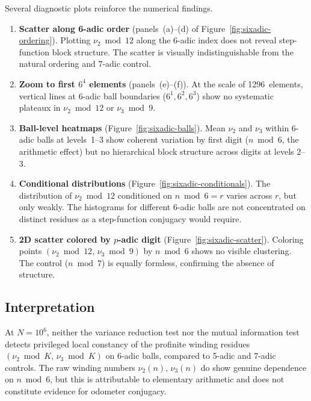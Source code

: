 \documentclass[11pt,a4paper]{article}
\theoremstyle{plain}
\theoremstyle{definition}
\begin{document}
Several diagnostic plots reinforce the numerical findings.

\begin{enumerate}
    \item \textbf{Scatter along 6-adic order} (panels~(a)--(d) of
    Figure~\ref{fig:sixadic-ordering}).
    Plotting $\nu_2 \bmod 12$ along the 6-adic index does not reveal
    step-function block structure.  The scatter is visually
    indistinguishable from the natural ordering and 7-adic control.

    \item \textbf{Zoom to first $6^4$ elements} (panels~(e)--(f)).
    At the scale of 1296~elements, vertical lines at 6-adic ball
    boundaries ($6^1, 6^2, 6^3$) show no systematic plateaux in
    $\nu_2 \bmod 12$ or $\nu_3 \bmod 9$.

    \item \textbf{Ball-level heatmaps} (Figure~\ref{fig:sixadic-balls}).
    Mean $\nu_2$ and $\nu_3$ within 6-adic balls at levels~1--3 show
    coherent variation by first digit ($n \bmod 6$, the arithmetic
    effect) but no hierarchical block structure across digits at levels
    2--3.

    \item \textbf{Conditional distributions}
    (Figure~\ref{fig:sixadic-conditionals}).
    The distribution of $\nu_2 \bmod 12$ conditioned on
    $n \bmod 6 = r$ varies across $r$, but only weakly.  The
    histograms for different 6-adic balls are not concentrated on
    distinct residues as a step-function conjugacy would require.

    \item \textbf{2D scatter colored by $p$-adic digit}
    (Figure~\ref{fig:sixadic-scatter}).
    Coloring points $(\nu_2 \bmod 12,\, \nu_3 \bmod 9)$ by
    $n \bmod 6$ shows no visible clustering.  The control
    ($n \bmod 7$) is equally formless, confirming the absence of
    structure.
\end{enumerate}


\subsection{Interpretation}

\begin{mainresult}
\label{res:sixadic-negative}
    At $N = 10^6$, neither the variance reduction test nor the
    mutual information test detects privileged local constancy of the
    profinite winding residues $(\nu_2 \bmod K,\, \nu_3 \bmod K)$ on
    6-adic balls, compared to 5-adic and 7-adic controls.  The raw
    winding numbers $\nu_2(n)$, $\nu_3(n)$ do show genuine
    dependence on $n \bmod 6$, but this is attributable to elementary
    arithmetic and does not constitute evidence for odometer conjugacy.
\end{mainresult}
\end{document}
